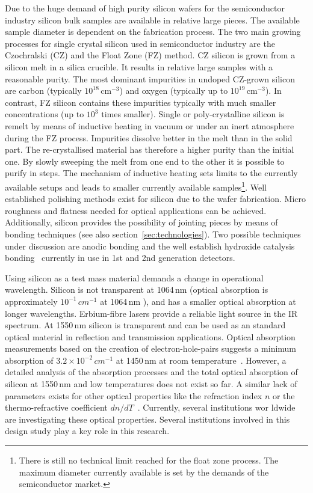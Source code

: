 Due to the huge demand of high purity silicon wafers for the semiconductor industry silicon bulk samples are available in relative large pieces. The available sample diameter is dependent on the fabrication process. The two main growing processes for single crystal silicon used in semiconductor industry are the Czochralski (CZ) and the Float Zone (FZ) method. CZ silicon is grown from a silicon melt in a silica crucible. It results in relative large samples with a reasonable purity. The most dominant impurities in undoped CZ-grown silicon are carbon (typically $10^{18}\,\mathrm{cm}^{-3}$) and oxygen (typically up to $10^{19}\,\mathrm{cm}^{-3}$). In contrast, FZ silicon contains these impurities typically with much smaller concentrations (up to $10^3$ times smaller). Single or poly-crystalline silicon is remelt by means of inductive heating in vacuum or under an inert atmosphere during the FZ process. Impurities dissolve better in the melt than in the solid part. The re-crystallised material has therefore a higher purity than the initial one. By slowly sweeping the melt from one end to the other it is possible to purify in steps. The mechanism of inductive heating sets limits to the currently available setups and leads to smaller currently available samples\footnote{There is still no technical limit reached for the float zone process. The maximum diameter currently available is set by the demands of the semiconductor market.}. Well established polishing methods exist for silicon due to the wafer fabrication. Micro roughness and flatness needed for optical applications can be achieved. Additionally, silicon provides the possibility of jointing pieces by means of bonding techniques (see also section~\ref{sec:technologies}). Two possible techniques under discussion are anodic bonding and the well establish hydroxide catalysis bonding~\cite{Veggel2009,Dari2010} currently in use in 1st and 2nd generation detectors. 

Using silicon as a test mass material demands a change in operational wavelength. Silicon is not transparent at 1064\,nm (optical absorption is approximately $10^{-1}\,cm^{-1}$ at 1064\,nm \cite{Green1995}), and has a smaller optical absorption at longer wavelengths. Erbium-fibre lasers provide a reliable light source in the IR spectrum. At 1550\,nm silicon is transparent and can be used as an standard optical material in reflection and transmission applications. Optical absorption measurements based on the creation of electron-hole-pairs suggests a minimum absorption of $3.2\times10^{-2}\,cm^{-1}$ at 1450\,nm at room temperature~\cite{Keevers1995}. However, a detailed analysis of the absorption processes and the total optical absorption of silicon at 1550\,nm and low temperatures does not exist so far. A similar lack of parameters exists for other optical properties like the refraction index $n$ or the thermo-refractive coefficient $dn/dT$~\cite{Frey2006}. Currently, several institutions wor ldwide are investigating these optical properties. Several institutions involved in this design study play a key role in this research.
 
